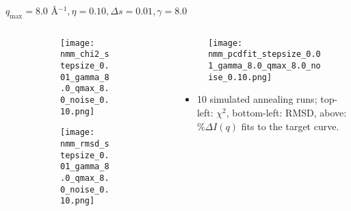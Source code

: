 \documentclass{beamer}
\begin{document}
\begin{frame}{$ q_{\textrm{max}}=8.0 $ \AA $^{-1}, \eta=0.10, \Delta s=0.01, \gamma=8.0$}
	\begin{columns}
		\begin{column}{.5\textwidth}
			\begin{figure}[H]
			\centering
			\begin{subfigure}[b]{\textwidth}
				\centering
				\texttt{[image: nmm\_chi2\_stepsize\_0.01\_gamma\_8.0\_qmax\_8.0\_noise\_0.10.png]}
				\label{fig:}
			\end{subfigure}
			\begin{subfigure}[b]{\textwidth}
				\centering
				\texttt{[image: nmm\_rmsd\_stepsize\_0.01\_gamma\_8.0\_qmax\_8.0\_noise\_0.10.png]}
				\label{fig:}
			\end{subfigure}
			\end{figure}
		\end{column}
		\begin{column}{.5\textwidth}
			\begin{figure}[H]
				\centering
				\texttt{[image: nmm\_pcdfit\_stepsize\_0.01\_gamma\_8.0\_qmax\_8.0\_noise\_0.10.png]}
				\label{fig:}
			\end{figure}
			\begin{itemize}
				\item 10 simulated annealing runs; top-left: $\chi^2$, bottom-left: RMSD, above: $\%\Delta I(q)$ fits to the target curve.
			\end{itemize}
		\end{column}
	\end{columns}
\end{frame}
 
\end{document}
